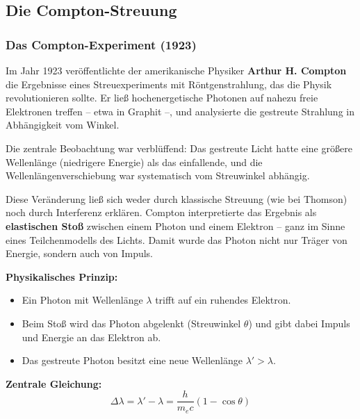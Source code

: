 \subsection{Die Compton-Streuung}

\subsubsection{Das Compton-Experiment (1923)}

Im Jahr 1923 veröffentlichte der amerikanische Physiker \textbf{Arthur H. Compton} die Ergebnisse eines Streuexperiments mit Röntgenstrahlung, das die Physik revolutionieren sollte. Er ließ hochenergetische Photonen auf nahezu freie Elektronen treffen – etwa in Graphit –, und analysierte die gestreute Strahlung in Abhängigkeit vom Winkel.

Die zentrale Beobachtung war verblüffend: Das gestreute Licht hatte eine größere Wellenlänge (niedrigere Energie) als das einfallende, und die Wellenlängenverschiebung war systematisch vom Streuwinkel abhängig.

Diese Veränderung ließ sich weder durch klassische Streuung (wie bei Thomson) noch durch Interferenz erklären. Compton interpretierte das Ergebnis als \textbf{elastischen Stoß} zwischen einem Photon und einem Elektron – ganz im Sinne eines Teilchenmodells des Lichts. Damit wurde das Photon nicht nur Träger von Energie, sondern auch von Impuls.

\textbf{Physikalisches Prinzip:}
\begin{itemize}
	\item Ein Photon mit Wellenlänge \( \lambda \) trifft auf ein ruhendes Elektron.
	\item Beim Stoß wird das Photon abgelenkt (Streuwinkel \( \theta \)) und gibt dabei Impuls und Energie an das Elektron ab.
	\item Das gestreute Photon besitzt eine neue Wellenlänge \( \lambda' > \lambda \).
\end{itemize}

\textbf{Zentrale Gleichung:}
\[
\Delta \lambda = \lambda' - \lambda = \frac{h}{m_e c}(1 - \cos \theta)
\]

